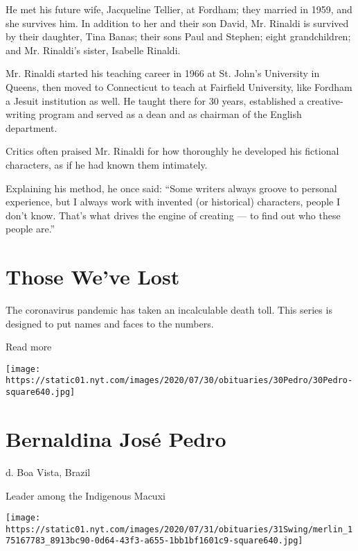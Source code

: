 He met his future wife, Jacqueline Tellier, at Fordham; they married in
1959, and she survives him. In addition to her and their son David, Mr.
Rinaldi is survived by their daughter, Tina Banas; their sons Paul and
Stephen; eight grandchildren; and Mr. Rinaldi's sister, Isabelle
Rinaldi.

Mr. Rinaldi started his teaching career in 1966 at St. John's University
in Queens, then moved to Connecticut to teach at Fairfield University,
like Fordham a Jesuit institution as well. He taught there for 30 years,
established a creative-writing program and served as a dean and as
chairman of the English department.

Critics often praised Mr. Rinaldi for how thoroughly he developed his
fictional characters, as if he had known them intimately.

Explaining his method, he once said: ``Some writers always groove to
personal experience, but I always work with invented (or historical)
characters, people I don't know. That's what drives the engine of
creating --- to find out who these people are.''

\href{https://www.nytimes.com/interactive/2020/obituaries/people-died-coronavirus-obituaries.html?action=click\&pgtype=Article\&state=default\&region=BELOW_MAIN_CONTENT\&context=covid_obits_promo}{}

\hypertarget{those-weve-lost}{%
\section{Those We've Lost}\label{those-weve-lost}}

The coronavirus pandemic has taken an incalculable death toll. This
series is designed to put names and faces to the numbers.

Read more

\texttt{[image: https://static01.nyt.com/images/2020/07/30/obituaries/30Pedro/30Pedro-square640.jpg]}

\hypertarget{bernaldina-josuxe9-pedro}{%
\section{Bernaldina José Pedro}\label{bernaldina-josuxe9-pedro}}

d. Boa Vista, Brazil

Leader among the Indigenous Macuxi

\texttt{[image: https://static01.nyt.com/images/2020/07/31/obituaries/31Swing/merlin\_175167783\_8913bc90-0d64-43f3-a655-1bb1bf1601c9-square640.jpg]}

